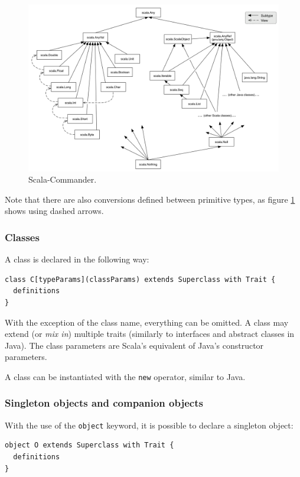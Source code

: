 \begin{figure}[h!] 
  \centering
    \includegraphics[width=1\textwidth]{images/scala_type_hierarchy.png}
  \caption{Scala-Commander.}
  \label{fig:scala_type_hierarchy}  
\end{figure}

Note that there are also conversions defined between primitive types, as figure \ref{fig:scala_type_hierarchy} shows using dashed arrows.

\subsubsection{Classes}

A class is declared in the following way:

\begin{lstlisting}
class C[typeParams](classParams) extends Superclass with Trait {
  definitions
}
\end{lstlisting}

With the exception of the class name, everything can be omitted. A class may extend (or \emph{mix in}) multiple traits (similarly to interfaces and abstract classes in Java). The class parameters are Scala's equivalent of Java's constructor parameters.

A class can be instantiated with the \texttt{new} operator, similar to Java.

\subsubsection{Singleton objects and companion objects}

With the use of the \texttt{object} keyword, it is possible to declare a singleton object:
\begin{lstlisting}
object O extends Superclass with Trait {
  definitions
}
\end{lstlisting}


